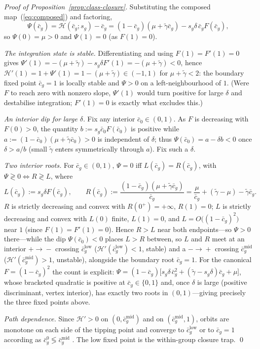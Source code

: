 \documentclass[pdflatex,sn-basic]{sn-jnl}
\theoremstyle{thmstyleone}
\numberwithin{proposition}{subsection}
\begin{document}
\begin{proof}[Proof of Proposition~\ref{prop:class-closure}]
Substituting the composed map~(\ref{eq:composed}) and factoring,
\[
  \Psi(\bar{c}_g) = \mathcal{H}(\bar{c}_g; s_g) - \bar{c}_g
  = (1-\bar{c}_g)(\mu + \tilde{\gamma}\bar{c}_g)
    - s_g\delta\,\bar{c}_g F(\bar{c}_g),
\]
so $\Psi(0) = \mu > 0$ and $\Psi(1) = 0$ (as $F(1)=0$).

\emph{The integration state is stable.} Differentiating and using
$F(1)=F'(1)=0$ gives
$\Psi'(1) = -(\mu+\tilde{\gamma}) - s_g\delta F'(1) = -(\mu+\tilde{\gamma}) < 0$,
hence $\mathcal{H}'(1) = 1+\Psi'(1) = 1-(\mu+\tilde{\gamma}) \in (-1,1)$ for
$\mu+\tilde{\gamma}<2$: the boundary fixed point $\bar{c}_g = 1$ is locally
stable and $\Psi > 0$ on a left-neighbourhood of $1$. (Were $F$ to reach
zero with nonzero slope, $\Psi'(1)$ would turn positive for large $\delta$
and destabilise integration; $F'(1)=0$ is exactly what excludes this.)

\emph{An interior dip for large $\delta$.} Fix any interior
$\bar{c}_0 \in (0,1)$. As $F$ is decreasing with $F(0)>0$, the quantity
$b := s_g \bar{c}_0 F(\bar{c}_0)$ is positive while
$a := (1-\bar{c}_0)(\mu+\tilde{\gamma}\bar{c}_0) > 0$ is independent of
$\delta$; thus $\Psi(\bar{c}_0) = a - \delta b < 0$ once $\delta > a/b$
(small $\tilde{\gamma}$ enters symmetrically through $a$). Fix such a
$\delta$.

\emph{Two interior roots.} For $\bar{c}_g \in (0,1)$, $\Psi=0$ iff
$L(\bar{c}_g)=R(\bar{c}_g)$, with $\Psi \gtrless 0 \iff R \gtrless L$, where
\[
  L(\bar{c}_g) := s_g\delta F(\bar{c}_g),
  \qquad
  R(\bar{c}_g) := \frac{(1-\bar{c}_g)(\mu+\tilde{\gamma}\bar{c}_g)}{\bar{c}_g}
   = \frac{\mu}{\bar{c}_g} + (\tilde{\gamma}-\mu) - \tilde{\gamma}\bar{c}_g .
\]
$R$ is strictly decreasing and convex with $R(0^{+})=+\infty$, $R(1)=0$;
$L$ is strictly decreasing and convex with $L(0)$ finite, $L(1)=0$, and
$L = O\!\big((1-\bar{c}_g)^2\big)$ near $1$ (since $F(1)=F'(1)=0$). Hence
$R>L$ near both endpoints---so $\Psi>0$ there---while the dip
$\Psi(\bar{c}_0)<0$ places $L>R$ between, so $L$ and $R$ meet at an interior
$+\!\to\!-$ crossing $\bar{c}_g^{\mathrm{low}}$
($\mathcal{H}'(\bar{c}_g^{\mathrm{low}})<1$, stable) and a $-\!\to\!+$
crossing $\bar{c}_g^{\mathrm{mid}}$
($\mathcal{H}'(\bar{c}_g^{\mathrm{mid}})>1$, unstable), alongside the
boundary root $\bar{c}_g=1$. For the canonical $F=(1-\bar{c}_g)^2$ the count
is explicit:
$\Psi = (1-\bar{c}_g)\big[s_g\delta\,\bar{c}_g^{2}
 + (\tilde{\gamma}-s_g\delta)\bar{c}_g + \mu\big]$,
whose bracketed quadratic is positive at $\bar{c}_g\in\{0,1\}$ and, once
$\delta$ is large (positive discriminant, vertex interior), has exactly two
roots in $(0,1)$---giving precisely the three fixed points above.

\emph{Path dependence.} Since $\mathcal{H}'>0$ on
$(0,\bar{c}_g^{\mathrm{mid}})$ and on $(\bar{c}_g^{\mathrm{mid}},1)$, orbits
are monotone on each side of the tipping point and converge to
$\bar{c}_g^{\mathrm{low}}$ or to $\bar{c}_g=1$ according as
$\bar{c}_g^{0}\lessgtr\bar{c}_g^{\mathrm{mid}}$ \citep[ch.~1]{Galor2007}.
The low fixed point is the within-group closure trap. \qed
\end{proof}
\end{document}
